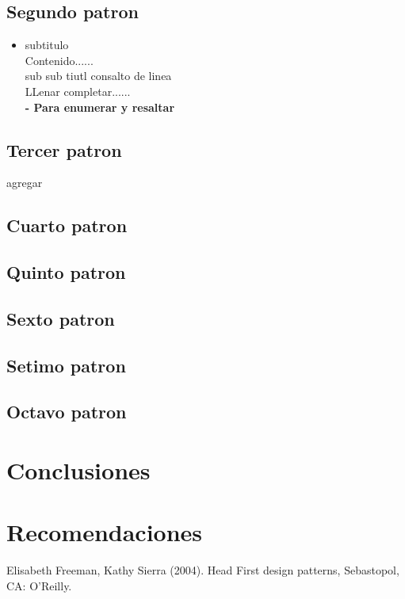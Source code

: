 \documentclass[twoside,twocolumn]{article}
\begin{document}
\subsection{Segundo patron}


\begin{itemize}
\item subtitulo
\\ Contenido......
\\sub sub tiutl consalto de linea
\\LLenar completar......
\\ \textbf{- Para enumerar y resaltar}
\end{itemize}

\subsection{Tercer patron}
agregar
\subsection{Cuarto patron}
\subsection{Quinto patron}
\subsection{Sexto patron}
\subsection{Setimo patron}
\subsection{Octavo patron}



\section{Conclusiones}


\section{Recomendaciones}

\begin{thebibliography}{99} %

\bibitem
Elisabeth Freeman, Kathy Sierra (2004).
\newblock Head First design patterns,
\newblock Sebastopol,
\newblock CA: O'Reilly.
 
 
\end{thebibliography}

\end{document}
